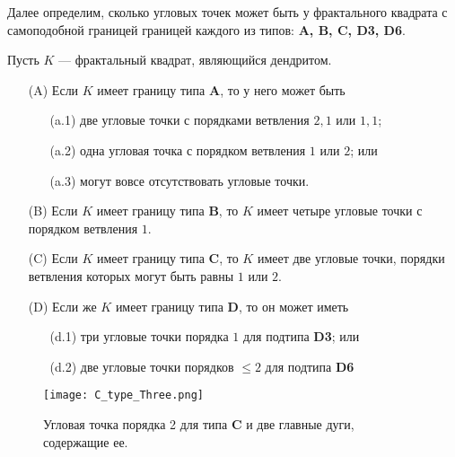 Далее определим, сколько угловых точек может быть у фрактального квадрата с самоподобной границей границей каждого из типов: {\bf A, B, C, D3, D6}.

\begin{theorem}\label{thm:corner}
Пусть $K$ --- фрактальный квадрат, являющийся дендритом.
\begin{itemize}[nolistsep]
\item[(A)] Если $K$ имеет границу типа  {\bf A}, то у него может быть
	\begin{itemize}[nolistsep]
	\item[(a.1)] две угловые точки с порядками ветвления $2,1$ или $1,1$;
	\item[(a.2)] одна угловая точка с порядком ветвления $1$ или $2$; или 
	\item[(a.3)] могут вовсе отсутствовать угловые точки.
	\end{itemize}
\item[(B)] Если $K$ имеет границу типа  {\bf B}, то $K$ имеет четыре угловые точки с порядком ветвления $1$.
\item[(C)] Если $K$ имеет границу типа {\bf C}, то $K$ имеет две угловые точки, порядки ветвления которых могут быть равны $1$ или $2$.
\item[(D)] Если же $K$ имеет границу типа  {\bf D}, то он может иметь 
	\begin{itemize}[nolistsep]
	\item[(d.1)] три угловые точки порядка $1$ для подтипа {\bf D3}; или
	\item[(d.2)] две угловые точки порядков $\le 2$ для подтипа {\bf D6}
	\end{itemize}
\end{itemize}
\end{theorem}

\begin{figure}[h!]
    \centering
    \texttt{[image: C\_type\_Three.png]}
    \caption{Угловая точка порядка 2 для типа {\bf C} и две главные дуги, содержащие ее.} 
    \label{fig:C_type_Three}
\end{figure}

